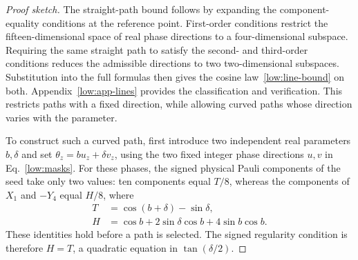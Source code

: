 \begin{proof}[Proof sketch]
The straight-path bound follows by expanding the component-equality conditions at the reference point. First-order conditions restrict the fifteen-dimensional space of real phase directions to a four-dimensional subspace. Requiring the same straight path to satisfy the second- and third-order conditions reduces the admissible directions to two two-dimensional subspaces. Substitution into the full formulas then gives the cosine law~\eqref{low:line-bound} on both. Appendix~\ref{low:app-lines} provides the classification and verification. This restricts paths with a fixed direction, while allowing curved paths whose direction varies with the parameter.

To construct such a curved path, first introduce two independent real parameters $b,\delta$ and set $\theta_z=bu_z+\delta v_z$, using the two fixed integer phase directions $u,v$ in Eq.~\eqref{low:masks}.
For these phases, the signed physical Pauli components of the seed take
only two values: ten components equal $T/8$, whereas the components of
$X_1$ and $-Y_4$ equal $H/8$, where
\begin{align}
 T&=\cos(b+\delta)-\sin\delta,\nonumber\\
 H&=\cos b+2\sin\delta\cos b+4\sin b\cos b.
 \label{low:two-components}
\end{align}
These identities hold before a path is selected.  The signed regularity
condition is therefore $H=T$, a quadratic equation in $\tan(\delta/2)$.


\end{proof}
